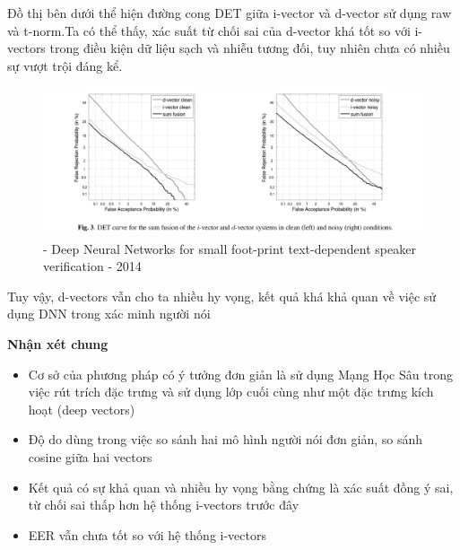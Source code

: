 \documentclass{article}
\begin{document}
	Đồ thị bên dưới thể hiện đường cong DET giữa i-vector và d-vector sử dụng raw và t-norm.Ta có thể thấy, xác suất từ chối sai của d-vector khá tốt so với i-vectors trong điều kiện dữ liệu sạch và nhiễu tương đối, tuy nhiên chưa có nhiều sự vượt trội đáng kể.
	\begin{figure}[H]
		\centering
		\includegraphics[width=0.85\linewidth]{images/i-vectors-d-vectors-det-sum-fusion.png}
		\caption{- Deep Neural Networks for small foot-print text-dependent speaker verification - 2014}
		\label{fig:writing-thesis}
	\end{figure}
	Tuy vậy, d-vectors vẫn cho ta nhiều hy vọng, kết quả khá khả quan về việc sử dụng DNN trong xác minh người nói
	
	\textbf{Nhận xét chung}
	\begin{itemize}
		\item Cơ sở của phương pháp có ý tưởng đơn giản là sử dụng Mạng Học Sâu trong việc rút trích đặc trưng và sử dụng lớp cuối cùng như một đặc trưng kích hoạt (deep vectors)
		\item Độ do dùng trong việc so sánh hai mô hình người nói đơn giản, so sánh cosine giữa hai vectors
		\item Kết quả có sự khả quan và nhiều hy vọng bằng chứng là xác suất đồng ý sai, từ chối sai thấp hơn hệ thống i-vectors trước đây
		\item EER vẫn chưa tốt so với hệ thống i-vectors
	\end{itemize}
	
\end{document}
